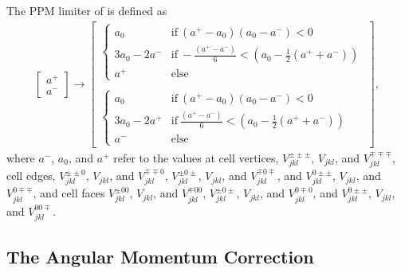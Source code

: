 \documentclass{aastex63}
\begin{document}
The PPM limiter of \cite{COLELLA1984} is defined as
\begin{align}
\label{ppm_limiter}
  \begin{bmatrix}
 	a^+ \\
        a^-
  \end{bmatrix} \rightarrow
  \begin{bmatrix}
 	\begin{cases}
             a_0 &  \mathrm{if} \ \left(a^+ - a_0\right)\left(a_0 - a^-\right) < 0 \\
             3 a_0 - 2 a^- & \mathrm{if}  \ -\frac{\left(a^+ - a^-\right)}{6} < \left(a_0 - \tfrac{1}{2}\left(a^+ + a^-\right)\right) \\
             a^+ &  \mathrm{else}
        \end{cases} \\
\\
         \begin{cases}
             a_0 &  \mathrm{if} \ \left(a^+ - a_0\right)\left(a_0 - a^-\right) < 0 \\
             3 a_0 - 2 a^+ & \mathrm{if} \ \frac{\left(a^+ - a^-\right)}{6} < \left(a_0 - \tfrac{1}{2}\left(a^+ + a^-\right)\right) \\
             a^- &  \mathrm{else}
        \end{cases}
  \end{bmatrix},
\end{align}
where $a^-$, $a_0$, and $a^+$ refer to the values at cell vertices, $V^{\pm\pm\pm}_{j k l}$, $V_{j k l}$, and $V^{\mp\mp\mp}_{j k l}$, cell edges,
$V^{\pm\pm 0}_{j k l}$, $V_{j k l}$, and $V^{\mp\mp 0}_{j k l}$,
$V^{\pm 0 \pm}_{j k l}$, $V_{j k l}$, and $V^{\mp 0 \mp}_{j k l}$,
and
$V^{0 \pm\pm}_{j k l}$, $V_{j k l}$, and $V^{0 \mp\mp}_{j k l}$, 
and cell faces
$V^{\pm 0 0}_{j k l}$, $V_{j k l}$, and $V^{\mp 0 0}_{j k l}$,
$V^{\pm 0 \pm}_{j k l}$, $V_{j k l}$, and $V^{0 \mp 0}_{j k l}$,
and
$V^{0 \pm \pm}_{j k l}$, $V_{j k l}$, and $V^{0 0 \mp}_{j k l}$.

\subsection{The Angular Momentum Correction}
\end{document}
